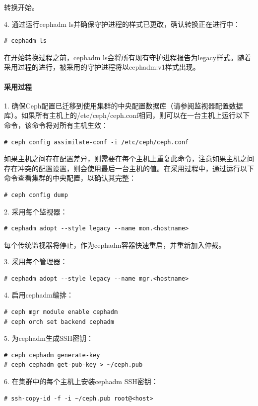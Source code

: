 \documentclass[12pt,UTF8]{ctexbook}
\begin{document}
转换开始。

4. 通过运行cephadm ls并确保守护进程的样式已更改，确认转换正在进行中：
\begin{verbatim}
# cephadm ls
\end{verbatim}

在开始转换过程之前，cephadm ls会将所有现有守护进程报告为legacy样式。随着采用过程的进行，被采用的守护进程将以cephadm:v1样式出现。

\paragraph{采用过程}

1. 确保Ceph配置已迁移到使用集群的中央配置数据库（请参阅监视器配置数据库）。如果所有主机上的/etc/ceph/ceph.conf相同，则可以在一台主机上运行以下命令，该命令将对所有主机生效：
\begin{verbatim}
# ceph config assimilate-conf -i /etc/ceph/ceph.conf
\end{verbatim}

如果主机之间存在配置差异，则需要在每个主机上重复此命令，注意如果主机之间存在冲突的配置设置，则会使用最后一台主机的值。在采用过程中，通过运行以下命令查看集群的中央配置，以确认其完整：
\begin{verbatim}
# ceph config dump
\end{verbatim}

2. 采用每个监视器：
\begin{verbatim}
# cephadm adopt --style legacy --name mon.<hostname>
\end{verbatim}

每个传统监视器将停止，作为cephadm容器快速重启，并重新加入仲裁。

3. 采用每个管理器：
\begin{verbatim}
# cephadm adopt --style legacy --name mgr.<hostname>
\end{verbatim}

4. 启用cephadm编排：
\begin{verbatim}
# ceph mgr module enable cephadm
# ceph orch set backend cephadm
\end{verbatim}

5. 为cephadm生成SSH密钥：
\begin{verbatim}
# ceph cephadm generate-key
# ceph cephadm get-pub-key > ~/ceph.pub
\end{verbatim}

6. 在集群中的每个主机上安装cephadm SSH密钥：
\begin{verbatim}
# ssh-copy-id -f -i ~/ceph.pub root@<host>
\end{verbatim}
\end{document}
